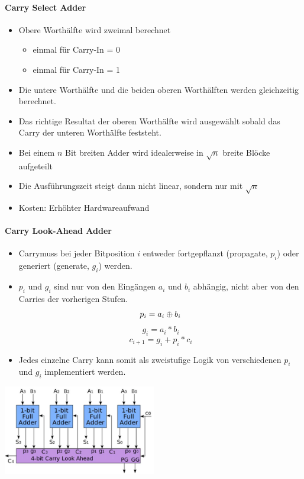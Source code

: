 \paragraph{Carry Select Adder}
\begin{itemize}
	\item Obere Worthälfte wird zweimal berechnet
	\begin{itemize}
		\item einmal für Carry-In = 0
		\item einmal für Carry-In = 1
	\end{itemize}
	\item Die untere Worthälfte und die beiden oberen Worthälften werden gleichzeitig berechnet.
	\item Das richtige Resultat der oberen Worthälfte wird ausgewählt sobald das Carry der unteren Worthälfte feststeht.
	\item Bei einem $n$ Bit breiten Adder wird idealerweise in $\sqrt{n}$ breite Blöcke aufgeteilt
	\item Die Ausführungszeit steigt dann nicht linear, sondern nur mit $\sqrt{n}$
	\item Kosten: Erhöhter Hardwareaufwand
\end{itemize}

\paragraph{Carry Look-Ahead Adder}
	\begin{multicols}{2}
		\begin{itemize}
		\item Carrymuss bei jeder Bitposition $i$ entweder fortgepflanzt (propagate, $p_i$) oder generiert (generate, $g_i$) werden.
		\item  $p_i$ und $g_i$ sind nur von den Eingängen $a_i$ und $b_i$ abhängig, nicht aber von den Carries der vorherigen Stufen.
		\begin{equation}
			p_i = a_i \oplus b_i \newline
		\end{equation}
		\begin{equation}
		g_i = a_i * b_i
		\end{equation}
		\begin{equation}
		c_{i+1} = g_i + p_i * c_i
		\end{equation}
		\item  Jedes einzelne Carry kann somit als zweistufige Logik von verschiedenen $p_i$ und $g_i$ implementiert werden.
	\end{itemize}
\columnbreak
	\includegraphics[width=0.5\textwidth]{images/Arithmetik/Carry_Look_Ahead_Adder}
\end{multicols}

